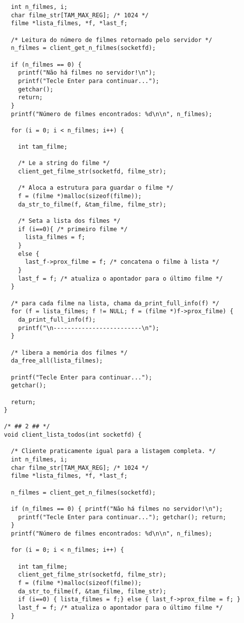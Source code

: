 \documentclass[11pt,twoside]{article}
\begin{document}
\begin{verbatim}
  int n_filmes, i;
  char filme_str[TAM_MAX_REG]; /* 1024 */
  filme *lista_filmes, *f, *last_f;
	
  /* Leitura do número de filmes retornado pelo servidor */
  n_filmes = client_get_n_filmes(socketfd);

  if (n_filmes == 0) {
    printf("Não há filmes no servidor!\n");
    printf("Tecle Enter para continuar...");
    getchar();
    return;
  }
  printf("Número de filmes encontrados: %d\n\n", n_filmes);

  for (i = 0; i < n_filmes; i++) {

    int tam_filme;
		
    /* Le a string do filme */
    client_get_filme_str(socketfd, filme_str);

    /* Aloca a estrutura para guardar o filme */
    f = (filme *)malloc(sizeof(filme));
    da_str_to_filme(f, &tam_filme, filme_str);

    /* Seta a lista dos filmes */
    if (i==0){ /* primeiro filme */
      lista_filmes = f;
    }
    else {
      last_f->prox_filme = f; /* concatena o filme à lista */
    }
    last_f = f; /* atualiza o apontador para o último filme */
  }
	
  /* para cada filme na lista, chama da_print_full_info(f) */
  for (f = lista_filmes; f != NULL; f = (filme *)f->prox_filme) {
    da_print_full_info(f);
    printf("\n-------------------------\n");
  }
	
  /* libera a memória dos filmes */
  da_free_all(lista_filmes);

  printf("Tecle Enter para continuar...");
  getchar();

  return;
}

/* ## 2 ## */
void client_lista_todos(int socketfd) {

  /* Cliente praticamente igual para a listagem completa. */
  int n_filmes, i;
  char filme_str[TAM_MAX_REG]; /* 1024 */
  filme *lista_filmes, *f, *last_f;
	
  n_filmes = client_get_n_filmes(socketfd);

  if (n_filmes == 0) { printf("Não há filmes no servidor!\n");
    printf("Tecle Enter para continuar..."); getchar(); return;
  }
  printf("Número de filmes encontrados: %d\n\n", n_filmes);

  for (i = 0; i < n_filmes; i++) {

    int tam_filme;
    client_get_filme_str(socketfd, filme_str);
    f = (filme *)malloc(sizeof(filme));
    da_str_to_filme(f, &tam_filme, filme_str);
    if (i==0) { lista_filmes = f;} else { last_f->prox_filme = f; }
    last_f = f; /* atualiza o apontador para o último filme */
  }
	

\end{verbatim}
\end{document}
